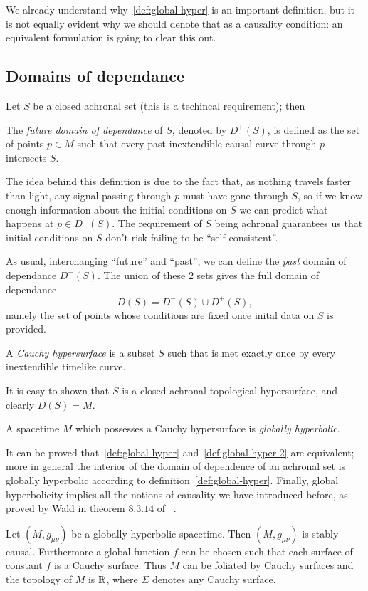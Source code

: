 We already understand why~\ref{def:global-hyper} is an important definition, but it is not equally evident why we should denote that as a causality condition: an equivalent formulation is going to clear this out.

\subsection{Domains of dependance}
Let \(S\) be a closed achronal set (this is a techincal requirement); then
\begin{definition}
	The \emph{future domain of dependance} of \(S\), denoted by \(D^+(S)\), is defined as
	the set of points \(p\in M\) such that every past inextendible causal curve through \(p\) intersects \(S\).
\end{definition}

The idea behind this definition is due to the fact that, as nothing travels faster than light, any signal passing through \(p\) must have gone through \(S\), so if we know enough information about the initial conditions on \(S\) we can predict what happens at \(p\in D^+(S)\). The requirement of \(S\) being achronal guarantees us that initial conditions on \(S\) don't risk failing to be ``self-consistent''.

As usual, interchanging ``future'' and ``past'', we can define the \emph{past} domain of dependance \(D^-(S)\). The union of these \(2\) sets gives the full domain of dependance 
\[
	D(S) = D^-(S) \cup D^+(S),
\]
namely the set of points whose conditions are fixed once inital data on \(S\) is provided.
\begin{definition}
	A \emph{Cauchy hypersurface} is a subset \(S\) such that is met exactly once by every inextendible timelike curve.
\end{definition}
It is easy to shown that \(S\) is a closed achronal topological hypersurface, and clearly \(D(S) = M\).
\begin{definition}
	\label{def:global-hyper-2}
	A spacetime \(M\) which possesses a Cauchy hypersurface is \emph{globally hyperbolic}.
\end{definition}
It can be proved that~\ref{def:global-hyper} and~\ref{def:global-hyper-2} are equivalent; more in general the interior of the domain of dependence of an achronal set is globally hyperbolic according to definition~\ref{def:global-hyper}. Finally, global hyperbolicity implies all the notions of causality we have introduced before, as proved by Wald in theorem \(8.3.14\) of~\cite{wald2010general} .
\begin{theorem}
	Let \((M,g_{\mu\nu})\) be a globally hyperbolic spacetime. Then \((M,g_{\mu\nu})\) is stably causal. Furthermore a global function \(f\) can be chosen such that each surface of constant \(f\) is a Cauchy surface. Thus \(M\) can be foliated by Cauchy surfaces and the topology of \(M\) is \(\R \time\Sigma\), where \(\Sigma\) denotes any Cauchy surface.
\end{theorem}

